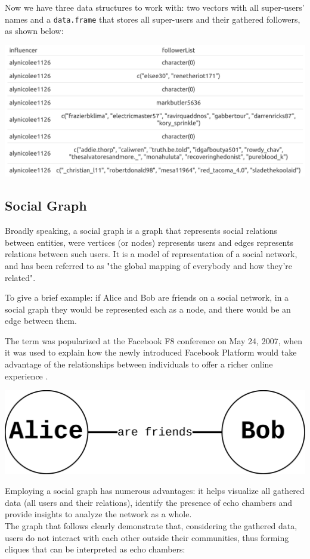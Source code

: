 Now we have three data structures to work with: two vectors with all super-users' names and a \verb+data.frame+ that stores all super-users and their gathered followers, as shown below:

\aCapo{}
\includegraphics[width = .48\textwidth]{images/total_table_p23.png}

\subsection{Social Graph}

Broadly speaking, a social graph is a graph that represents social relations between entities, were vertices (or nodes) represents users and edges represents relations between such users. It is a model of representation of a social network, and has been referred to as "the global mapping of everybody and how they're related".

To give a brief example: if Alice and Bob are friends on a social network, in a social graph they would be represented each as a node, and there would be an edge between them.

The term was popularized at the Facebook F8 conference on May 24, 2007, when it was used to explain how the newly introduced Facebook Platform would take advantage of the relationships between individuals to offer a richer online experience \cite{wikiSAN}.

\aCapo{}
\includegraphics[width = .5\textwidth]{images/alice_bob_san.png}

Employing a social graph has numerous advantages: it helps visualize all gathered data (all users and their relations), identify the presence of echo chambers and provide insights to analyze the network as a whole. \\
The graph that follows clearly demonstrate that, considering the gathered data, users do not interact with each other outside their communities, thus forming cliques that can be interpreted as echo chambers:

